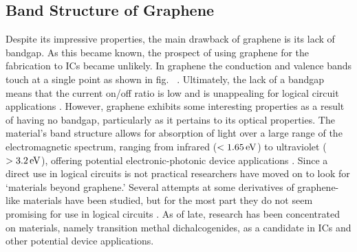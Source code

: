 \subsection{Band Structure of Graphene}\label{subsec:graphene_bandstructure}
\noindent Despite its impressive properties, the main drawback of graphene is its lack of bandgap. As this became known, the prospect of using graphene for the fabrication to \acp{IC} became unlikely. In graphene the conduction and valence bands touch at a single point as shown in fig.~ \cite{Wallace_PhysRev1947}. Ultimately, the lack of a bandgap means that the current on/off ratio is low and is unappealing for logical circuit applications \cite{Xu_ChemRev2013}. However, graphene exhibits some interesting properties as a result of having no bandgap, particularly as it pertains to its optical properties. The material's band structure allows for absorption of light over a large range of the electromagnetic spectrum, ranging from infrared ($<1.65\,\mathrm{eV}$) to ultraviolet ($>3.2\,\mathrm{eV}$), offering potential electronic-photonic device applications \cite{Xia_NatureNano2009,Wang_Science2008,Geim_NatureComm2011}. Since a direct use in logical circuits is not practical researchers have moved on to look for `\td materials beyond graphene.' Several attempts at some derivatives of graphene-like materials have been studied, but for the most part they do not seem promising for use in logical circuits \cite{Takeda_PhysRev1994,Cahangirov_PhysRevLett2009}. As of late, research has been concentrated on \td materials, namely transition methal dichalcogenides, as a candidate in \acp{IC} and other potential device applications.

